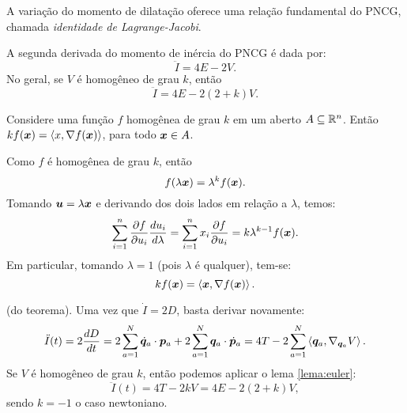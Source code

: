 A variação do momento de dilatação oferece uma relação fundamental do PNCG, chamada \textit{identidade de Lagrange-Jacobi}.

\begin{theorem}\label{teorema:lagrange_jacobi}
    A segunda derivada do momento de inércia do PNCG é dada por:
    \begin{equation}
        \ddot I = 4 E - 2 V.
    \end{equation}
    No geral, se $V$ é homogêneo de grau $k$, então
    \begin{equation}
        \ddot I = 4 E - 2 (2 + k) V.
    \end{equation}
\end{theorem}
\begin{lemma}\label{lema:euler}
    Considere uma função $f$ homogênea de grau $k$ em um aberto $A \subseteq \mathbb{R}^n$. Então $k f(\bm x) = \left\langle x, \nabla f(\bm x) \right\rangle$, para todo $\bm x \in A$.
\end{lemma}
\begin{Proof}
    Como $f$ é homogênea de grau $k$, então
    \begin{equation*}
        f(\lambda \bm x) = \lambda^k f(\bm x).
    \end{equation*}
    Tomando $\bm u = \lambda \bm x$ e derivando dos dois lados em relação a $\lambda$, temos:
    \begin{equation*}
        \sum_{i=1}^n \dfrac{\partial f}{\partial u_i} \dfrac{d u_i}{d \lambda} = \sum_{i=1}^n x_i \dfrac{\partial f}{\partial u_i} = k \lambda^{k-1} f(\bm x).
    \end{equation*}
    Em particular, tomando $\lambda = 1$ (pois $\lambda$ é qualquer), tem-se:
    \begin{equation*}
        k f(\bm x) = \left\langle \bm x, \nabla f(\bm x) \right\rangle.
    \end{equation*}
\end{Proof}
\begin{Proof}
    (do teorema). Uma vez que $\dot I = 2D$, basta derivar novamente:
    \begin{equation*}
        \ddot I (t) = 2 \dfrac{d D}{d t} = 2 \sum_{a=1}^N \dot {\bm q}_a \cdot \bm p_a + 2 \sum_{a=1}^{N} \bm q_a \cdot \dot {\bm p}_a = 4 T - 2 \sum_{a=1}^{N} \left\langle \bm q_a, \nabla_{\bm q_a} V \right\rangle.
    \end{equation*}
    Se $V$ é homogêneo de grau $k$, então podemos aplicar o lema \ref{lema:euler}:
    \begin{equation*}
        \ddot I(t) = 4 T - 2 k V = 4 E - 2 (2+k) V,
    \end{equation*}
    sendo $k = -1$ o caso newtoniano.
\end{Proof}

